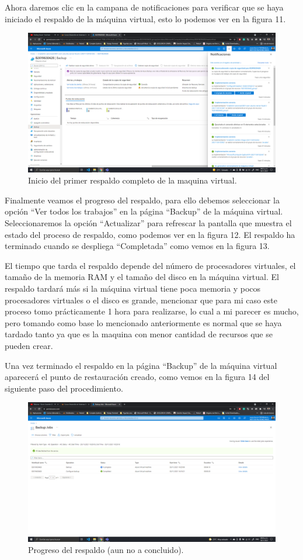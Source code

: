 \documentclass[11pt]{article}
\begin{document}
		 Ahora daremos clic en la campana de notificaciones para verificar que se haya iniciado el respaldo de la máquina virtual, esto lo podemos ver en la figura 11.
		 \begin{figure}[H]
			\centering
			\includegraphics[scale=0.34]{resources/2.5.png}
			\caption{Inicio del primer respaldo completo de la maquina virtual.}\label{fig:picture}
		\end{figure}
		Finalmente veamos el progreso del respaldo, para ello debemos seleccionar la opción ``Ver todos los trabajos'' en la página ``Backup'' de la máquina virtual. Seleccionaremos la opción ``Actualizar'' para refrescar la pantalla que muestra el estado del proceso de respaldo, como podemos ver en la figura 12. El respaldo ha terminado cuando se despliega ``Completada'' como vemos en la figura 13. \par
		El tiempo que tarda el respaldo depende del número de procesadores virtuales, el tamaño de la memoria RAM y el tamaño del disco en la máquina virtual. El respaldo tardará más si la máquina virtual tiene poca memoria y pocos procesadores virtuales o el disco es grande, mencionar que para mi caso este proceso tomo prácticamente 1 hora para realizarse, lo cual a mi parecer es mucho, pero tomando como base lo mencionado anteriormente es normal que se haya tardado tanto ya que es la maquina con menor cantidad de recursos que se pueden crear.\par
		Una vez terminado el respaldo en la página ``Backup'' de la máquina virtual aparecerá el punto de restauración creado, como vemos en la figura 14 del siguiente paso del procedimiento.
		\begin{figure}[H]
			\centering
			\includegraphics[scale=0.34]{resources/2.6.1.png}
			\caption{Progreso del respaldo (aun no a concluido).}\label{fig:picture}
		\end{figure}
\end{document}

